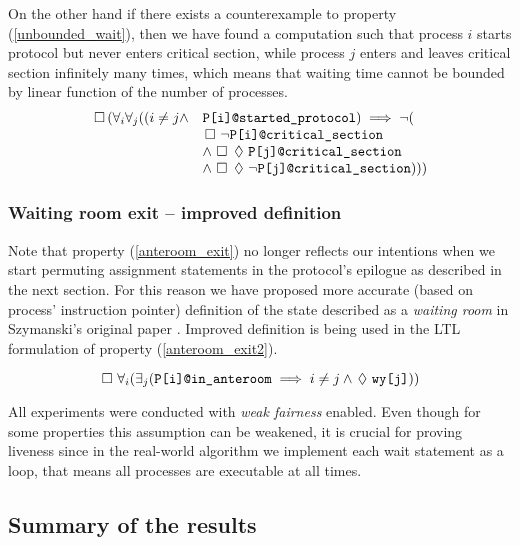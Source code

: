 On the other hand if there exists a counterexample to property (\ref{unbounded_wait}), then we have found a computation such that process $i$ starts protocol but never enters critical section, while process $j$ enters and leaves critical section infinitely many times, which means that waiting time cannot be bounded by linear function of the number of processes.
\begin{equation}
\begin{array}{rl}
\always (\forall_i \forall_j ((i \neq j \land & \verb+P[i]@started_protocol+) \implies \neg ( \\
 & \always \neg \verb+P[i]@critical_section+ \\
 & \land \always \eventually \verb+P[j]@critical_section+ \\
 & \land \always \eventually \neg \verb+P[j]@critical_section+)))
\end{array}
\label{unbounded_wait}
\end{equation}

\subsubsection*{Waiting room exit -- improved definition}

Note that property (\ref{anteroom_exit}) no longer reflects our intentions when we start permuting assignment statements in the protocol's epilogue as described in the next section.
For this reason we have proposed more accurate (based on process' instruction pointer) definition of the state described as a \emph{waiting room} in Szymanski's original paper \cite{Original}.
Improved definition is being used in the LTL formulation of property (\ref{anteroom_exit2}).

\begin{equation}
\always \forall_i (\exists_j (\verb+P[i]@in_anteroom+ \implies i \neq j \land \eventually \verb+wy[j]+))
\label{anteroom_exit2}
\end{equation}

All experiments were conducted with \emph{weak fairness} enabled.
Even though for some properties this assumption can be weakened, it is crucial for proving liveness since in the real-world algorithm we implement each wait statement as a loop, that means all processes are executable at all times.

\subsection*{Summary of the results}

